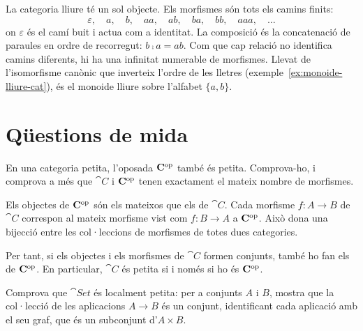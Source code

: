\begin{solucio}
La categoria lliure té un sol objecte. Els morfismes són tots els camins finits:
\[
\varepsilon,
\quad a,
\quad b,
\quad aa,
\quad ab,
\quad ba,
\quad bb,
\quad aaa,
\quad\ldots
\]
on $\varepsilon$ és el camí buit i actua com a identitat. La composició és la concatenació de paraules en ordre de recorregut: $b\comp a=ab$. Com que cap relació no identifica camins diferents, hi ha una infinitat numerable de morfismes. Llevat de l'isomorfisme canònic que inverteix l'ordre de les lletres (exemple~\ref{ex:monoide-lliure-cat}), és el monoide lliure sobre l'alfabet $\{a,b\}$.
\end{solucio}

\section{Qüestions de mida}

\begin{exercici}
En una categoria petita, l'oposada $\mathbf{C}^{\mathrm{op}}$ també és petita. Comprova-ho, i comprova a més que $\cat{C}$ i $\mathbf{C}^{\mathrm{op}}$ tenen exactament el mateix nombre de morfismes.
\end{exercici}

\begin{solucio}
Els objectes de $\mathbf{C}^{\mathrm{op}}$ són els mateixos que els de $\cat{C}$. Cada morfisme $f\colon A\to B$ de $\cat{C}$ correspon al mateix morfisme vist com $f\colon B\to A$ a $\mathbf{C}^{\mathrm{op}}$. Això dona una bijecció entre les col·leccions de morfismes de totes dues categories.

Per tant, si els objectes i els morfismes de $\cat{C}$ formen conjunts, també ho fan els de $\mathbf{C}^{\mathrm{op}}$. En particular, $\cat{C}$ és petita si i només si ho és $\mathbf{C}^{\mathrm{op}}$.
\end{solucio}

\begin{exercici}\label{exr:pr-set-localment-petita}
Comprova que $\cat{Set}$ és localment petita: per a conjunts $A$ i $B$, mostra que la col·lecció de les aplicacions $A\to B$ és un conjunt, identificant cada aplicació amb el seu graf, que és un subconjunt d'$A\times B$.
\end{exercici}

